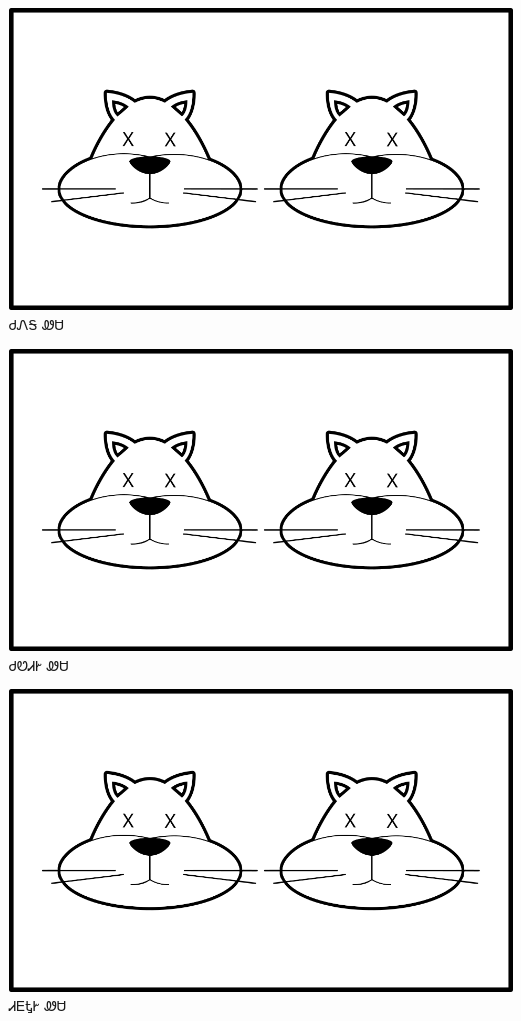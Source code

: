 \documentclass[avery5371]{flashcards}%
\begin{document}
\begin{flashcard}{
\includegraphics[width=0.95\columnwidth,height=.51\columnwidth,keepaspectratio]{../artwork/for-colors/wesa-tali-dead}
}
\Huge ᏧᏁᎦ ᏪᏌ
\end{flashcard}
\begin{flashcard}{
\includegraphics[width=0.95\columnwidth,height=.51\columnwidth,keepaspectratio]{../artwork/for-colors/wesa-tali-dead}
}
\Huge ᏧᏬᏗᎨ ᏪᏌ
\end{flashcard}
\begin{flashcard}{
\includegraphics[width=0.95\columnwidth,height=.51\columnwidth,keepaspectratio]{../artwork/for-colors/wesa-tali-dead}
}
\Huge ᏗᎬᎿᎨ ᏪᏌ
\end{flashcard}
\end{document}
